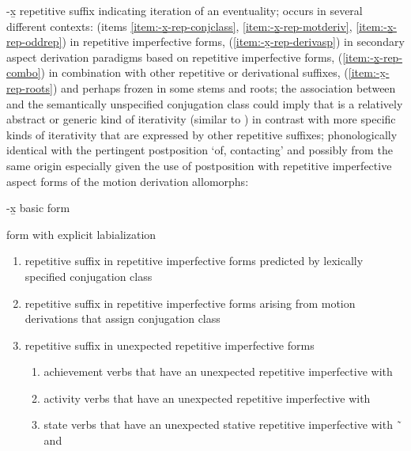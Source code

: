 \begin{morphdesc}[resume*=alphalist]
\item[-x̱]\label{m:-x̱}
	repetitive suffix indicating iteration of an eventuality;
	occurs in several different contexts:
		(items \ref{item:-x̱-rep-conjclass}, 
			\ref{item:-x̱-rep-motderiv},
			\ref{item:-x̱-rep-oddrep})
			in repetitive imperfective forms,
		(\ref{item:-x̱-rep-derivasp})
			in secondary aspect derivation paradigms
			based on  repetitive imperfective forms,
		(\ref{item:-x̱-rep-combo})
			in combination with other repetitive
			or derivational suffixes,
		(\ref{item:-x̱-rep-roots})
			and perhaps frozen in some stems and roots;
		the association between  and the semantically unspecified
			 conjugation class could imply that
			 is a relatively abstract or generic
			kind of iterativity (similar to )
			in contrast with more specific kinds of iterativity 
			that are expressed by other repetitive suffixes;
	phonologically identical with the pertingent postposition  ‘of, contacting’
		and possibly from the same origin especially given the use of postposition 
		with repetitive imperfective aspect forms of the motion derivation
	\newline
	allomorphs:
	\begin{allolist}
	\item[-x̱]	basic form
	\item[\X{-x̱w}]	form with explicit labialization
	\end{allolist}
	\begin{enumerate}
	\item	\label{item:-x̱-rep-conjclass}
		repetitive suffix in repetitive imperfective forms predicted
			by lexically specified  conjugation class
	\item	\label{item:-x̱-rep-motderiv}
		repetitive suffix in repetitive imperfective forms
			arising from motion derivations that assign
			 conjugation class 
	\item	\label{item:-x̱-rep-oddrep}
		repetitive suffix in unexpected repetitive imperfective forms
		\begin{enumerate}
		\item	achievement verbs that have an unexpected repetitive imperfective with 
		\item	activity verbs that have an unexpected repetitive imperfective with 
		\item	state verbs that have an unexpected stative repetitive imperfective
			with  \~\  and 

\end{enumerate}
\end{enumerate}
\end{morphdesc}
